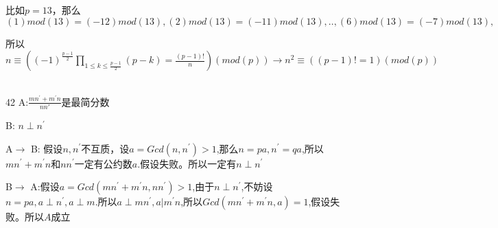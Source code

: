 \documentclass[onecolumn]{article}
\begin{document}
比如$p=13$，那么$(1)mod(13)=(-12)mod(13),(2)mod(13)=(-11)mod(13),..,(6)mod(13)=(-7)mod(13),$ \par
所以$n\equiv \left ( (-1)^{\frac{p-1}{2}}\prod_{1\leq k \leq \frac{p-1}{2}}(p-k)=\frac{(p-1)!}{n} \right )(mod(p))\rightarrow n^{2}\equiv \left ((p-1)!=1  \right )(mod(p))$ \par
~\\
42 A:$\frac{mn^{'}+m^{'}n}{nn{'}}$是最简分数 \par
B: $n\perp n^{'} $ \par
A$\rightarrow$ B: 假设$n,n^{'}$不互质，设$a=Gcd(n,n^{'}) > 1$,那么$n=pa,n^{'}=qa$,所以$mn^{'}+m^{'}n$和$nn^{'}$一定有公约数$a$.假设失败。所以一定有$n\perp n^{'}$ \par
B$\rightarrow$ A:假设$a=Gcd(mn^{'}+m^{'}n,nn^{'})>1$,由于$n\perp n^{'} $,不妨设$n=pa,a\perp n^{'},a\perp m $.所以$a\perp mn^{'},a|m^{'}n$,所以$Gcd(mn^{'}+m^{'}n,a)=1$,假设失败。所以$A$成立
\end{document}
